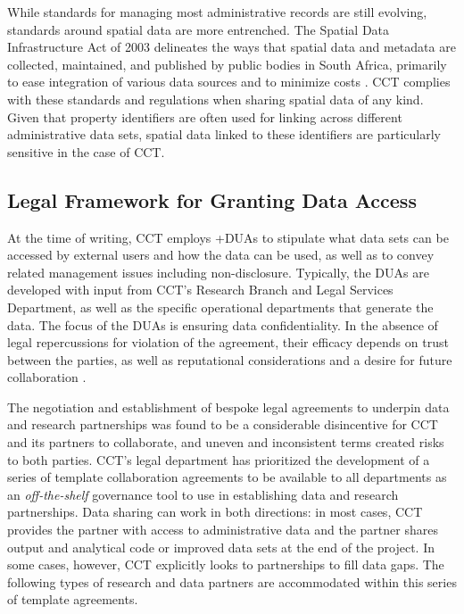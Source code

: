 \documentclass[
]{book}
\begin{document}
While standards for managing most administrative records are still evolving, standards around spatial data are more entrenched. The Spatial Data Infrastructure Act of 2003 delineates the ways that spatial data and metadata are collected, maintained, and published by public bodies in South Africa, primarily to ease integration of various data sources and to minimize costs \citep{republicofsouthafrica2003}. CCT complies with these standards and regulations when sharing spatial data of any kind. Given that property identifiers are often used for linking across different administrative data sets, spatial data linked to these identifiers are particularly sensitive in the case of CCT.

\hypertarget{legal-framework-for-granting-data-access-6}{%
\subsection{Legal Framework for Granting Data Access}\label{legal-framework-for-granting-data-access-6}}

At the time of writing, CCT employs +DUAs\textbar{} to stipulate what data sets can be accessed by external users and how the data can be used, as well as to convey related management issues including non-disclosure. Typically, the DUAs are developed with input from CCT's Research Branch and Legal Services Department, as well as the specific operational departments that generate the data. The focus of the DUAs is ensuring data confidentiality. In the absence of legal repercussions for violation of the agreement, their efficacy depends on trust between the parties, as well as reputational considerations and a desire for future collaboration \citep{sexton2017}.

The negotiation and establishment of bespoke legal agreements to underpin data and research partnerships was found to be a considerable disincentive for CCT and its partners to collaborate, and uneven and inconsistent terms created risks to both parties. CCT's legal department has prioritized the development of a series of template collaboration agreements to be available to all departments as an \emph{off-the-shelf} governance tool to use in establishing data and research partnerships. Data sharing can work in both directions: in most cases, CCT provides the partner with access to administrative data and the partner shares output and analytical code or improved data sets at the end of the project. In some cases, however, CCT explicitly looks to partnerships to fill data gaps. The following types of research and data partners are accommodated within this series of template agreements.
\end{document}
